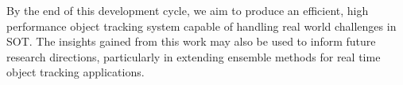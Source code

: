 \documentclass[11pt, letterpaper]{article}
\begin{document}
By the end of this development cycle, we aim to produce an efficient, high performance object tracking system capable of handling real world challenges in SOT. The insights gained from this work may also be used to inform future research directions, particularly in extending ensemble methods for real time object tracking applications.


\clearpage


\end{document}
